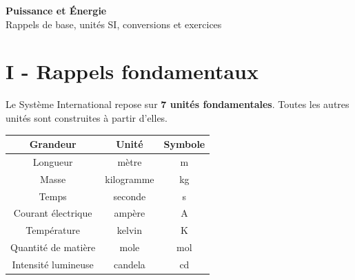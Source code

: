 \documentclass[11pt,a4paper]{article}
\newcommand{\theorybox}[2]{
\begin{tcolorbox}[title=\textbf{#1}]
#2
\end{tcolorbox}
}
\begin{document}

\begin{center}
{\LARGE \textbf{Puissance et Énergie}}\\[0.3cm]
{\large Rappels de base, unités SI, conversions et exercices}\\[0.5cm]
\end{center}


\section*{I - Rappels fondamentaux}

\theorybox{A - Les 7 unités de base du Système International (SI)}{
Le Système International repose sur \textbf{7 unités fondamentales}.  
Toutes les autres unités sont construites à partir d’elles.

\begin{center}
\begin{tabular}{|c|c|c|}
\hline
\textbf{Grandeur} & \textbf{Unité} & \textbf{Symbole} \\
\hline
Longueur & mètre & m \\
Masse & kilogramme & kg \\
Temps & seconde & s \\
Courant électrique & ampère & A \\
Température & kelvin & K \\
Quantité de matière & mole & mol \\
Intensité lumineuse & candela & cd \\
\hline
\end{tabular}
\end{center}
}
\end{document}
